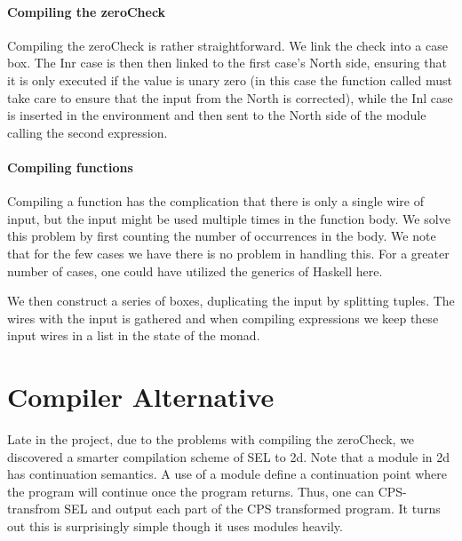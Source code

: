 \paragraph{Compiling the zeroCheck}
\label{sec:compiling-zerochk}

Compiling the zeroCheck is rather straightforward. We link the check into a case box. The Inr case is then then linked to the first case's North side, ensuring that it is only executed if the value is unary zero (in this case the function called must take care to ensure that the input from the North is corrected), while the Inl case is inserted in the environment and then sent to the North side of the module calling the second expression.


\paragraph{Compiling functions}
\label{sec:compiling-functions}

Compiling a function has the complication that there is only a single
wire of input, but the input might be used multiple times in the
function body. We solve this problem by first counting the number of
occurrences in the body. We note that for the few cases we have there
is no problem in handling this. For a greater number of cases, one could
have utilized the generics of Haskell here.

We then construct a series of boxes, duplicating the input by
splitting tuples. The wires with the input is gathered and when
compiling expressions we keep these input wires in a list in the state
of the monad.


\section{Compiler Alternative}
\label{chap:compiler-alter}

Late in the project, due to the problems with compiling the zeroCheck,
we discovered a smarter compilation scheme of SEL to 2d. Note that
a module in 2d has continuation semantics. A use of a module define a
continuation point where the program will continue once the program
returns. Thus, one can CPS-transfrom SEL and output each part of the
CPS transformed program. It turns out this is surprisingly simple
though it uses modules heavily.

